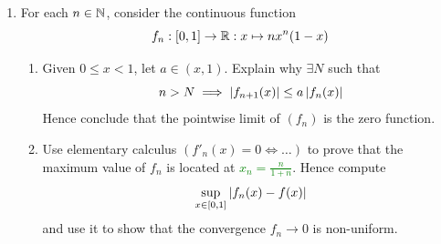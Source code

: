 \begin{exercises}
\begin{enumerate}
	
		\item\label{ex:classicnonuniform} For each $n\in\mathbb{N}$, consider the continuous function
		\[f_n:[0,1]\to\mathbb{R}:x\mapsto nx^n(1-x)\]
		\begin{enumerate}
		  \item Given $0\le x<1$, let $a\in(x,1)$. Explain why
		   $\exists N$ such that
		  \[n>N\implies \left| f_{n+1}(x)\right|\le a\left| f_n(x)\right|\]
		  Hence conclude that the pointwise limit of $(f_n)$ is the zero function.
		  \item Use elementary calculus $(f'_n(x)=0\iff\ldots)$ to prove that the maximum value of $f_n$ is located at \textcolor{Green}{$x_n=\frac n{1+n}$}. Hence compute
			\[\sup_{x\in[0,1]}\left| f_n(x)-f(x)\right|\]
			and use it to show that the convergence $f_n\to 0$ is non-uniform.
		\end{enumerate}
		

\end{enumerate}
\end{exercises}
